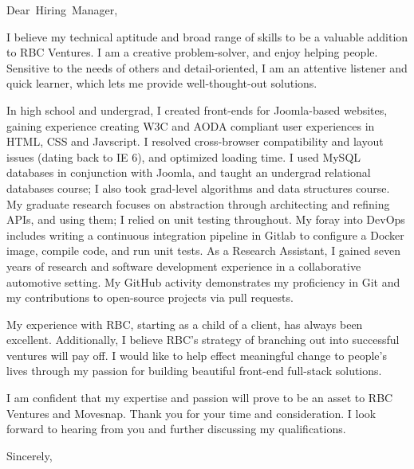 \documentclass[
fontsize=12pt,
paper=letter,
parskip=half,
enlargefirstpage=on,    %
fromalign=right,        %
fromphone=on,           %
fromemail=on,
fromrule=aftername,     %
addrfield=off,           %
backaddress=off,         %
subject=beforeopening,  %
locfield=narrow,        %
foldmarks=off,           %
]{scrlttr2}
\renewcommand{\\}{\ {\large\textperiodcentered}\ }
\begin{document}

\begin{letter}{}


\opening{Dear~Hiring~Manager,}

I believe my technical aptitude and broad range of skills to be a valuable addition to RBC Ventures.
I am a creative problem-solver, and enjoy helping people.
Sensitive to the needs of others and detail-oriented, I am an attentive listener and quick learner, which lets me provide well-thought-out solutions.

In high school and undergrad, I created front-ends for Joomla-based websites, gaining experience creating W3C and AODA compliant user experiences in HTML, CSS and Javscript.
I resolved cross-browser compatibility and layout issues (dating back to IE 6), and optimized loading time.
I used MySQL databases in conjunction with Joomla, and taught an undergrad relational databases course; I also took grad-level algorithms and data structures course.
My graduate research focuses on abstraction through architecting and refining APIs, and using them; I relied on unit testing throughout.
My foray into {\nobreak DevOps} includes writing a continuous integration pipeline in Gitlab to configure a Docker image, compile code, and run unit tests.
As a Research Assistant, I gained seven years of research and software development experience in a collaborative automotive setting.
My GitHub activity demonstrates my proficiency in Git and my contributions to open-source projects via pull requests.

My experience with RBC, starting as a child of a client, has always been excellent.
Additionally, I believe RBC's strategy of branching out into successful ventures will pay off.
I would like to help effect meaningful change to people's lives through my passion for building beautiful front-end full-stack solutions.

I am confident that my expertise and passion will prove to be an asset to RBC Ventures and Movesnap.
Thank you for your time and consideration.
I look forward to hearing from you and further discussing my qualifications.
\closing{Sincerely,}


\end{letter}
\end{document}
